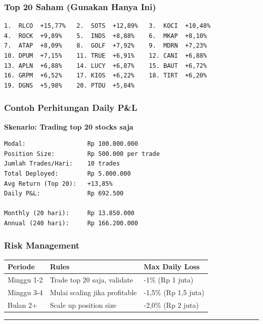 \documentclass[
  10pt,
  a4paper,
]{article}
\begin{document}
\subsubsection{Top 20 Saham (Gunakan Hanya
Ini)}\label{top-20-saham-gunakan-hanya-ini}

\begin{verbatim}
1.  RLCO  +15,77%   2.  SOTS  +12,89%   3.  KOCI  +10,48%
4.  ROCK  +9,89%    5.  INDS  +8,88%    6.  MKAP  +8,10%
7.  ATAP  +8,09%    8.  GOLF  +7,92%    9.  MDRN  +7,23%
10. DPUM  +7,15%    11. TRUE  +6,91%    12. CANI  +6,88%
13. APLN  +6,88%    14. LUCY  +6,87%    15. BAUT  +6,72%
16. GRPM  +6,52%    17. KIOS  +6,22%    18. TIRT  +6,20%
19. DGNS  +5,98%    20. PTDU  +5,84%
\end{verbatim}

\subsubsection{Contoh Perhitungan Daily
P\&L}\label{contoh-perhitungan-daily-pl}

\textbf{Skenario: Trading top 20 stocks saja}

\begin{verbatim}
Modal:                 Rp 100.000.000
Position Size:         Rp 500.000 per trade
Jumlah Trades/Hari:    10 trades
Total Deployed:        Rp 5.000.000
Avg Return (Top 20):   +13,85%
Daily P&L:             Rp 692.500

Monthly (20 hari):     Rp 13.850.000
Annual (240 hari):     Rp 166.200.000
\end{verbatim}

\subsubsection{Risk Management}\label{risk-management}

\begin{longtable}[]{@{}lll@{}}
\toprule\noalign{}
Periode & Rules & Max Daily Loss \\
\midrule\noalign{}
\endhead
\bottomrule\noalign{}
\endlastfoot
Minggu 1-2 & Trade top 20 saja, validate & -1\% (Rp 1 juta) \\
Minggu 3-4 & Mulai scaling jika profitable & -1,5\% (Rp 1,5 juta) \\
Bulan 2+ & Scale up position size & -2,0\% (Rp 2 juta) \\
\end{longtable}

\begin{center}\rule{0.5\linewidth}{0.5pt}\end{center}
\end{document}

